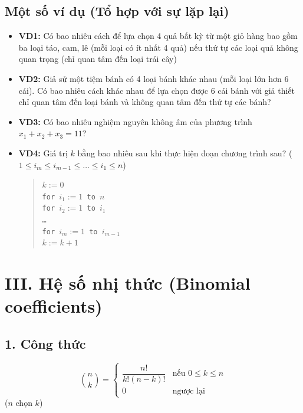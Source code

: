 \documentclass[12pt,a4paper]{article}
\begin{document}
\subsection*{Một số ví dụ (Tổ hợp với sự lặp lại)}
\begin{itemize}
    \item \textbf{VD1:} Có bao nhiêu cách để lựa chọn 4 quả bất kỳ từ một giỏ hàng bao gồm ba loại táo, cam, lê (mỗi loại có ít nhất 4 quả) nếu thứ tự các loại quả không quan trọng (chỉ quan tâm đến loại trái cây)
    \item \textbf{VD2:} Giả sử một tiệm bánh có 4 loại bánh khác nhau (mỗi loại lớn hơn 6 cái). Có bao nhiêu cách khác nhau để lựa chọn được 6 cái bánh với giả thiết chỉ quan tâm đến loại bánh và không quan tâm đến thứ tự các bánh?
    \item \textbf{VD3:} Có bao nhiêu nghiệm nguyên không âm của phương trình $x_1 + x_2 + x_3 = 11$?
    \item \textbf{VD4:} Giá trị $k$ bằng bao nhiêu sau khi thực hiện đoạn chương trình sau? ($1 \le i_m \le i_{m-1} \le \dots \le i_1 \le n$)
    \begin{quote}
        \texttt{$k := 0$}\\
        \texttt{for $i_1 := 1$ to $n$}\\
        \hspace*{0.5cm}\texttt{for $i_2 := 1$ to $i_1$}\\
        \hspace*{1cm}\texttt{\dots}\\
        \hspace*{1.5cm}\texttt{for $i_m := 1$ to $i_{m-1}$}\\
        \hspace*{2cm}\texttt{$k := k + 1$}
    \end{quote}
\end{itemize}

\hrulefill

\section*{III. Hệ số nhị thức (Binomial coefficients)}

\subsection*{1. Công thức}
$$\binom{n}{k} = \begin{cases} \dfrac{n!}{k!(n-k)!} & \text{nếu } 0 \le k \le n \\ 0 & \text{ngược lại} \end{cases}$$
($n$ chọn $k$)
\end{document}
